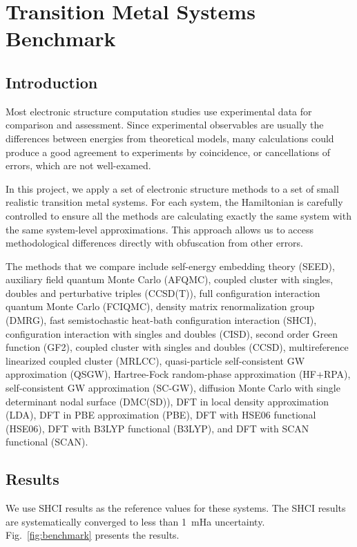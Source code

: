 \chapter{Transition Metal Systems Benchmark}
\label{ch:benchmark}
\section{Introduction}
Most electronic structure computation studies use experimental data for comparison and assessment.
Since experimental observables are usually the differences between energies from theoretical models, many calculations could produce a good agreement to experiments by coincidence, or cancellations of errors, which are not well-examed.

In this project, we apply a set of electronic structure methods to a set of small realistic transition metal systems.
For each system, the Hamiltonian is carefully controlled to ensure all the methods are calculating exactly the same system with the same system-level approximations.
This approach allows us to access methodological differences directly with obfuscation from other errors.

The methods that we compare include self-energy embedding theory (SEED), auxiliary field quantum Monte Carlo (AFQMC), coupled cluster with singles, doubles and perturbative triples (CCSD(T)), full configuration interaction quantum Monte Carlo (FCIQMC), density matrix renormalization group (DMRG), fast semistochastic heat-bath configuration interaction (SHCI), configuration interaction with singles and doubles (CISD), second order Green function (GF2), coupled cluster with singles and doubles (CCSD), multireference linearized coupled cluster (MRLCC), quasi-particle self-consistent GW approximation (QSGW), Hartree-Fock random-phase approximation (HF+RPA),  self-consistent GW approximation (SC-GW), diffusion Monte Carlo with single determinant nodal surface (DMC(SD)), DFT in local density approximation (LDA), DFT in PBE approximation (PBE), DFT with HSE06 functional (HSE06), DFT with B3LYP functional (B3LYP), and DFT with SCAN functional (SCAN).

\section{Results}

We use SHCI results as the reference values for these systems.
The SHCI results are systematically converged to less than 1~mHa uncertainty.
Fig.~\ref{fig:benchmark} presents the results.

